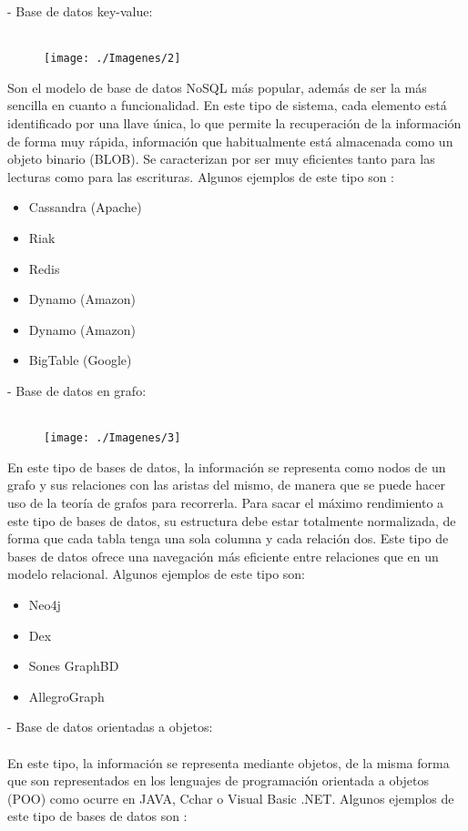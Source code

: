 \documentclass[%
 reprint,
 amsmath,amssymb,
 aps,
]{revtex4-1}
\begin{document}
 -  Base de datos key-value:
\\
\\
 \begin{figure}[htb]
	\begin{center}
	\texttt{[image: ./Imagenes/2]}
	\end{center}
	\end{figure}
Son el modelo de base de datos NoSQL más popular, además de ser la más sencilla en cuanto a funcionalidad. En este tipo de sistema, cada elemento está identificado por una llave única, lo que permite la recuperación de la información de forma muy rápida, información que habitualmente está almacenada como un objeto binario (BLOB). Se caracterizan por ser muy eficientes tanto para las lecturas como para las escrituras.  \cite{acens}
Algunos ejemplos de este tipo son :
           \begin{itemize}
		\item Cassandra (Apache)
		\item Riak
		\item Redis
		\item Dynamo (Amazon)
                     \item Dynamo (Amazon)
                     \item BigTable (Google)
	\end{itemize}
-  Base de datos en grafo:
\\
\\
 \begin{figure}[htb]
	\begin{center}
	\texttt{[image: ./Imagenes/3]}
	\end{center}
	\end{figure}
En este tipo de bases de datos, la información se representa como nodos de un grafo y sus relaciones con las aristas del mismo, de manera que se puede hacer uso de la teoría de grafos para recorrerla. Para sacar el máximo rendimiento a este tipo de bases de datos, su estructura debe estar totalmente normalizada, de forma que cada tabla tenga una sola columna y cada relación dos. 
Este tipo de bases de datos ofrece una navegación más eficiente entre relaciones que en un modelo relacional. \cite{acens}
Algunos ejemplos de este tipo son:
           \begin{itemize}
		\item Neo4j
		\item Dex
		\item Sones GraphBD
		\item AllegroGraph
	\end{itemize}
-  Base de datos orientadas a objetos:
\\
\\
En este tipo, la información se representa mediante objetos, de la misma forma que son representados en los lenguajes de programación orientada a objetos (POO) como ocurre en JAVA, Cchar o Visual Basic .NET. \cite{acens}
Algunos ejemplos de este tipo de bases de datos son : 
\end{document}
